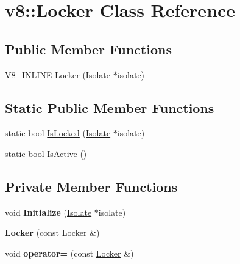 \hypertarget{classv8_1_1_locker}{}\section{v8\+:\+:Locker Class Reference}
\label{classv8_1_1_locker}
\subsection*{Public Member Functions}
\begin{DoxyCompactItemize}
\item 
V8\+\_\+\+I\+N\+L\+I\+NE \hyperlink{classv8_1_1_locker_a9f41151c92493a27d6724676fc774b51}{Locker} (\hyperlink{classv8_1_1_isolate}{Isolate} $\ast$isolate)
\end{DoxyCompactItemize}
\subsection*{Static Public Member Functions}
\begin{DoxyCompactItemize}
\item 
static bool \hyperlink{classv8_1_1_locker_ac6145adbb7acf7274458882a3de44169}{Is\+Locked} (\hyperlink{classv8_1_1_isolate}{Isolate} $\ast$isolate)
\item 
static bool \hyperlink{classv8_1_1_locker_addf73a36477c3f8721fd230199e86476}{Is\+Active} ()
\end{DoxyCompactItemize}
\subsection*{Private Member Functions}
\begin{DoxyCompactItemize}
\item 
void {\bfseries Initialize} (\hyperlink{classv8_1_1_isolate}{Isolate} $\ast$isolate)\hypertarget{classv8_1_1_locker_a0e07d8e2888b4489b73cfbf7e98e389c}{}\label{classv8_1_1_locker_a0e07d8e2888b4489b73cfbf7e98e389c}

\item 
{\bfseries Locker} (const \hyperlink{classv8_1_1_locker}{Locker} \&)\hypertarget{classv8_1_1_locker_a109234b888861166ab5fa97f68021deb}{}\label{classv8_1_1_locker_a109234b888861166ab5fa97f68021deb}

\item 
void {\bfseries operator=} (const \hyperlink{classv8_1_1_locker}{Locker} \&)\hypertarget{classv8_1_1_locker_ae06180c0ba39cdc842b0495a0a068f00}{}\label{classv8_1_1_locker_ae06180c0ba39cdc842b0495a0a068f00}

\end{DoxyCompactItemize}
